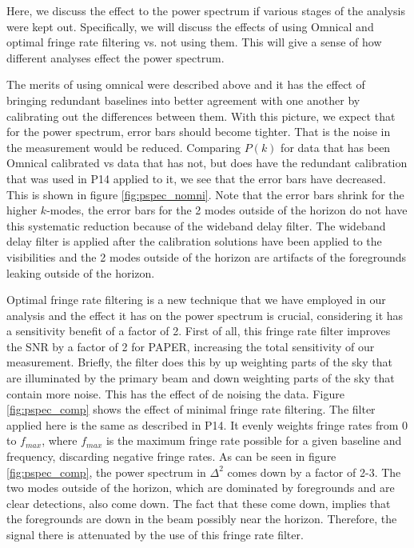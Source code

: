 \documentclass[twocolumn,numberedappendix]{emulateapj} \shorttitle{PSA64}
\begin{document}
Here, we discuss the effect to the power spectrum if various stages of the
analysis were kept out. Specifically, we will discuss the effects of using
Omnical and optimal fringe rate filtering vs. not using them. This will give a
sense of how different analyses effect the power spectrum.

The merits of using omnical were described above and it has the effect of
bringing redundant baselines into better agreement with one another by
calibrating out the differences between them. With this picture, we expect
that for the power spectrum, error bars should become tighter. That is the
noise in the measurement would be reduced. Comparing $P(k)$ for data that has
been Omnical calibrated vs data that has not, but does have the redundant
calibration that was used in P14 applied to it, we see that
the error bars have decreased. This is shown in figure \ref{fig:pspec_nomni}.
Note that the error bars shrink for the higher $k$-modes, the error bars for the
2 modes outside of the horizon do not have this systematic reduction because of
the wideband delay filter. The wideband delay filter is applied after the
calibration solutions have been applied to the visibilities and the 2 modes
outside of the horizon are artifacts of the foregrounds leaking outside of the
horizon. 

Optimal fringe rate filtering is a new technique that we have employed in our
analysis and the effect it has on the power spectrum is crucial, considering it
has a sensitivity benefit of a factor of 2. First of all, this fringe rate
filter improves the SNR by a factor of 2 for PAPER, increasing the total
sensitivity of our measurement. Briefly, the filter does this by up weighting
parts of the sky that are illuminated by the primary beam and down weighting
parts of the sky that contain more noise. This has the effect of de noising the
data. Figure \ref{fig:pspec_comp} shows the effect of minimal fringe rate
filtering. The filter applied here is the same as described in P14.
It evenly weights fringe rates from 0 to $f_{max}$,
where $f_{max}$ is the maximum fringe rate possible for a given baseline and
frequency, discarding negative fringe rates. As can be seen in figure
\ref{fig:pspec_comp}, the power spectrum in $\Delta^{2}$ comes down by a factor of
2-3. The two modes outside of the horizon, which are dominated by foregrounds
and are clear detections, also come down. The fact that these come down, implies
that the foregrounds are down in the beam possibly near the horizon. Therefore,
the signal there is attenuated by the use of this fringe rate filter. 
\end{document}
